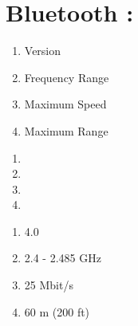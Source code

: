 \documentclass{article}
\begin{document}
\section{Bluetooth :}
\begin{multicols}{3}
\begin{enumerate}[label= ]
\item Version
\item Frequency Range
\item Maximum Speed
\item Maximum Range
\end{enumerate}
\columnbreak
\begin{enumerate}[label= ]
\item \textrightarrow
\item \textrightarrow
\item \textrightarrow
\item \textrightarrow
\end{enumerate}
\columnbreak
\begin{enumerate}[label= ]
\item 4.0
\item 2.4 - 2.485 GHz
\item 25 Mbit/s
\item 60 m (200 ft)
\end{enumerate}
\end{multicols}
\vspace{0.03\textheight} \
\end{document}
